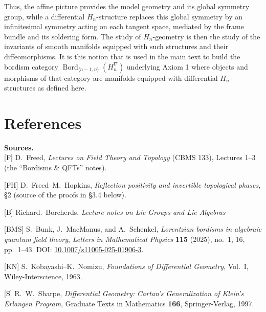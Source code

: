 \documentclass[a4paper,11pt]{article}
\begin{document}
\begin{appendices}
Thus, the affine picture provides the model geometry and its global symmetry
group, while a differential $H_n$-structure replaces this global symmetry by an infinitesimal symmetry acting on each tangent space, mediated by the frame bundle and its soldering form. The study of $H_n$-geometry is then the study of the invariants of smooth manifolds equipped with such structures and
their diffeomorphisms. It is this notion that is used in the main
text to build the bordism category $\operatorname{Bord}_{\langle
n-1,n\rangle}(H_n^\nabla)$ underlying Axiom 1 where objects and morphisms of that category are manifolds equipped with differential $H_n$-structures as defined here.

\end{appendices}

\section{References}

\begin{center}

\small
\textbf{Sources.}\\

[F] D.~Freed, \emph{Lectures on Field Theory and Topology} (CBMS 133), Lectures 1--3 (the ``Bordisms \& QFTs'' notes).\quad

[FH] D.~Freed--M.~Hopkins, \emph{Reflection positivity and invertible topological phases}, \S2 (source of the proofs in \S3.4 below).

[B] Richard.~Borcherds, \emph{Lecture notes on Lie Groups and Lie Algebras}

[BMS] S.~Bunk, J.~MacManus, and A.~Schenkel, \emph{Lorentzian bordisms in algebraic quantum field theory}, \emph{Letters in Mathematical Physics} \textbf{115} (2025), no.~1, 16, pp.~1--43. DOI: \href{https://doi.org/10.1007/s11005-025-01906-3}{10.1007/s11005-025-01906-3}.

[KN] S.~Kobayashi--K.~Nomizu, \emph{Foundations of Differential Geometry}, Vol.~I, Wiley-Interscience, 1963.

[S] R.~W.~Sharpe, \emph{Differential Geometry: Cartan's Generalization of Klein's Erlangen Program}, Graduate Texts in Mathematics \textbf{166}, Springer-Verlag, 1997.
\end{center}
\end{document}

